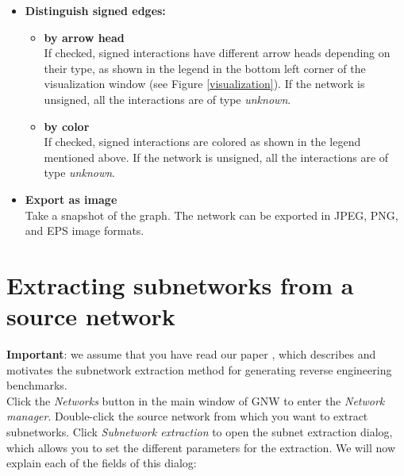 \documentclass{llncs}
\newenvironment{mylist}{
\begin{itemize}
}{\end{itemize}}
\begin{document}
\begin{mylist}
 \item \textbf{Distinguish signed edges:}
	\begin{itemize}
	 \item \textbf{by arrow head}\\If checked, signed interactions have different arrow heads depending on their type, as shown in the legend in the bottom left corner of the visualization window (see Figure \ref{visualization}). If the network is unsigned, all the interactions are of type \emph{unknown}.\\
	 \item \textbf{by color}\\If checked, signed interactions are colored as shown in the legend mentioned above. If the network is unsigned, all the interactions are of type \emph{unknown}.\\
	\end{itemize}
 \item \textbf{Export as image}\\Take a snapshot of the graph. The network can be exported in JPEG, PNG, and EPS image formats.
\end{mylist}




\section{Extracting subnetworks from a source network}

\textbf{Important}: we assume that you have read our paper \citep{Marbach2009}, which describes and motivates the subnetwork extraction method for generating reverse engineering benchmarks.\\

Click the \emph{Networks} button in the main window of GNW to enter the \emph{Network manager}. Double-click the source network from which you want to extract subnetworks. Click \emph{Subnetwork extraction} to open the subnet extraction dialog, which allows you to set the different parameters for the extraction. We will now explain each of the fields of this dialog:
\end{document}

